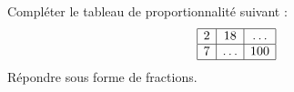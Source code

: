 
\begin{exercice}\label{exo2smath-0013}

    Compléter le tableau de proportionnalité suivant :
    \begin{equation*}
        \begin{array}[]{|c|c|c|}
            \hline
            2&18&\ldots\\
            \hline
            7&\ldots&100\\
            \hline
        \end{array}
    \end{equation*}
    Répondre sous forme de fractions.

\end{exercice}
